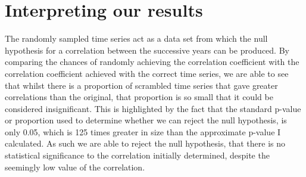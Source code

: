 \documentclass[12pt]{article}
\begin{document}
    \section{Interpreting our results}
    The randomly sampled time series act as a data set from which the null hypothesis
    for a correlation between the successive years can be produced. By comparing the
    chances of randomly achieving the correlation coefficient with the correlation
    coefficient achieved with the correct time series, we are able to see that whilst
    there is a proportion of scrambled time series that gave greater correlations than
    the original, that proportion is so small that it could be considered insignificant.
    This is highlighted by the fact that the standard p-value or proportion used to 
    determine whether we can reject the null hypothesis, is only 0.05, which is 125 times
    greater in size than the approximate p-value I calculated. As such we are able to
    reject the null hypothesis, that there is no statistical significance to the
    correlation initially determined, despite the seemingly low value of the correlation.
\end{document}
